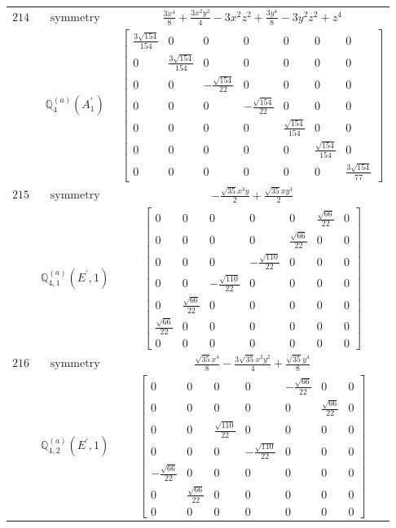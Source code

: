 \documentclass[fleqn,8pt,landscape]{jsarticle}
\begin{document}
\begin{longtable}{ccc}
$ 214 $ & $ \text{symmetry} $ & $ \frac{3 x^{4}}{8} + \frac{3 x^{2} y^{2}}{4} - 3 x^{2} z^{2} + \frac{3 y^{4}}{8} - 3 y^{2} z^{2} + z^{4} $ \\
$  $ & $ \mathbb{Q}_{4}^{(a)}(A_{1}^{\prime}) $ & $ \begin{bmatrix} \frac{3 \sqrt{154}}{154} & 0 & 0 & 0 & 0 & 0 & 0 \\ 0 & \frac{3 \sqrt{154}}{154} & 0 & 0 & 0 & 0 & 0 \\ 0 & 0 & - \frac{\sqrt{154}}{22} & 0 & 0 & 0 & 0 \\ 0 & 0 & 0 & - \frac{\sqrt{154}}{22} & 0 & 0 & 0 \\ 0 & 0 & 0 & 0 & \frac{\sqrt{154}}{154} & 0 & 0 \\ 0 & 0 & 0 & 0 & 0 & \frac{\sqrt{154}}{154} & 0 \\ 0 & 0 & 0 & 0 & 0 & 0 & \frac{3 \sqrt{154}}{77} \end{bmatrix} $ \\ \hline
$ 215 $ & $ \text{symmetry} $ & $ - \frac{\sqrt{35} x^{3} y}{2} + \frac{\sqrt{35} x y^{3}}{2} $ \\
$  $ & $ \mathbb{Q}_{4,1}^{(a)}(E^{\prime},1) $ & $ \begin{bmatrix} 0 & 0 & 0 & 0 & 0 & \frac{\sqrt{66}}{22} & 0 \\ 0 & 0 & 0 & 0 & \frac{\sqrt{66}}{22} & 0 & 0 \\ 0 & 0 & 0 & - \frac{\sqrt{110}}{22} & 0 & 0 & 0 \\ 0 & 0 & - \frac{\sqrt{110}}{22} & 0 & 0 & 0 & 0 \\ 0 & \frac{\sqrt{66}}{22} & 0 & 0 & 0 & 0 & 0 \\ \frac{\sqrt{66}}{22} & 0 & 0 & 0 & 0 & 0 & 0 \\ 0 & 0 & 0 & 0 & 0 & 0 & 0 \end{bmatrix} $ \\ \hline
$ 216 $ & $ \text{symmetry} $ & $ \frac{\sqrt{35} x^{4}}{8} - \frac{3 \sqrt{35} x^{2} y^{2}}{4} + \frac{\sqrt{35} y^{4}}{8} $ \\
$  $ & $ \mathbb{Q}_{4,2}^{(a)}(E^{\prime},1) $ & $ \begin{bmatrix} 0 & 0 & 0 & 0 & - \frac{\sqrt{66}}{22} & 0 & 0 \\ 0 & 0 & 0 & 0 & 0 & \frac{\sqrt{66}}{22} & 0 \\ 0 & 0 & \frac{\sqrt{110}}{22} & 0 & 0 & 0 & 0 \\ 0 & 0 & 0 & - \frac{\sqrt{110}}{22} & 0 & 0 & 0 \\ - \frac{\sqrt{66}}{22} & 0 & 0 & 0 & 0 & 0 & 0 \\ 0 & \frac{\sqrt{66}}{22} & 0 & 0 & 0 & 0 & 0 \\ 0 & 0 & 0 & 0 & 0 & 0 & 0 \end{bmatrix} $ \\ \hline

\end{longtable}
\end{document}
